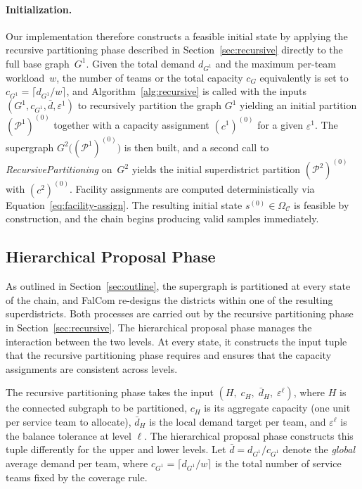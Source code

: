 \documentclass[11pt]{article}
\theoremstyle{definition}
\begin{document}
\paragraph{Initialization.} Our implementation therefore constructs a feasible initial state by applying the recursive partitioning phase
described in Section~\ref{sec:recursive} directly to the full base graph~$G^1$. Given the total demand $d_{G^1}$ and the maximum per-team workload~$w$, the number of teams or the total capacity $c_G$ equivalently is
set to $c_{G^1} = \lceil d_{G^1} / w \rceil$, and Algorithm~\ref{alg:recursive} is called with the inputs $(G^1, c_{G^1}, \bar{d}, \varepsilon^1)$ to recursively partition the graph $G^1$ yielding an initial partition $(\mathcal{P}^1)^{(0)}$ together with a
capacity assignment $(c^1)^{(0)}$ for a given $\varepsilon^1$. The supergraph $G^2\bigl((\mathcal{P}^1)^{(0)}\bigr)$ is then built, and a second call to \textit{RecursivePartitioning} on~$G^2$ yields the initial superdistrict partition $(\mathcal{P}^2)^{(0)}$ with $(c^2)^{(0)}$.  Facility assignments are computed deterministically via Equation~\eqref{eq:facility-assign}. The resulting initial state $s^{(0)} \in \Omega_\mathcal{C}$ is feasible by construction, and the chain begins producing valid samples immediately.

\subsection{Hierarchical Proposal Phase}
\label{sec:proposal}

As outlined in Section~\ref{sec:outline}, the supergraph is partitioned at every state of the chain, and FalCom re-designs the districts within one of the resulting superdistricts.  Both processes are carried out by the recursive partitioning phase in Section~\ref{sec:recursive}.  The hierarchical proposal phase manages the interaction between the two levels. At every state, it constructs the input tuple that the recursive partitioning phase requires and ensures that the capacity assignments are
consistent across levels.

The recursive partitioning phase takes the input
$(H,\; c_H,\; \bar{d}_H,\; \varepsilon^\ell)$, where $H$ is the connected subgraph to be partitioned, $c_H$ is its aggregate capacity (one unit per service team to allocate), $\bar{d}_H$ is the local demand target per team, and $\varepsilon^{\ell}$ is the balance tolerance at level $\ell$. The hierarchical proposal phase constructs this tuple differently for the upper and lower levels. Let $\bar{d} = d_{G^1} / c_{G^1}$ denote the \emph{global} average demand per team, where $c_{G^1} = \lceil d_{G^1} / w \rceil$ is the total number of service teams fixed by the coverage rule.
\end{document}
